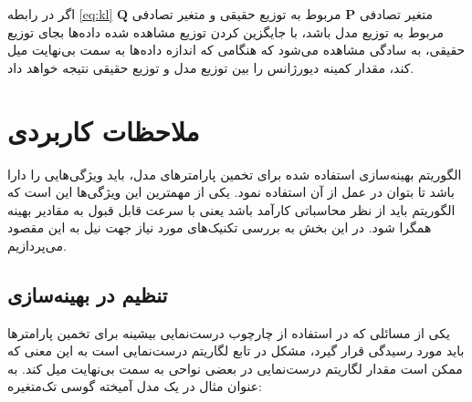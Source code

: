 اگر در رابطه \ref{eq:kl} متغیر تصادفی
$\bm{P}$
مربوط به توزیع حقیقی و متغیر تصادفی
$\bm{Q}$
مربوط به توزیع مدل باشد، با جایگزین کردن توزیع مشاهده شده داده‌ها بجای توزیع حقیقی، به سادگی مشاهده می‌شود که
{}
هنگامی که اندازه داده‌ها به سمت بی‌نهایت میل کند، مقدار کمینه دیورژانس  را بین توزیع مدل و توزیع حقیقی نتیجه خواهد داد.

\section{ملاحظات کاربردی}
الگوریتم بهینه‌سازی استفاده شده برای تخمین پارامترهای مدل، باید ویژگی‌هایی را دارا باشد تا بتوان در عمل از آن استفاده نمود.
یکی از مهمترین این ویژگی‌ها این است که الگوریتم باید از نظر محاسباتی کارآمد باشد یعنی با سرعت قابل قبول به مقادیر بهینه همگرا شود.
در این بخش به بررسی تکنیک‌های مورد نیاز جهت نیل به این مقصود می‌پردازیم.

\subsection{تنظیم در بهینه‌سازی} %
یکی از مسائلی که در استفاده از چارچوب درست‌نمایی بیشینه برای تخمین پارامترها باید مورد رسیدگی قرار گیرد، مشکل
{}
در تابع لگاریتم درست‌نمایی است به این معنی که ممکن است مقدار لگاریتم درست‌نمایی در بعضی نواحی به سمت بی‌نهایت میل کند.
به عنوان مثال در یک مدل آمیخته گوسی تک‌متغیره:








